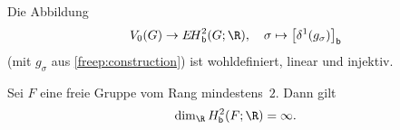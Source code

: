 \begin{thProposition}
    \label{freep:qmtocoho}%
    Die Abbildung
    \[ V_0(G) \to \EHb^2(G;\R), \quad
        \sigma \mapsto \bigl[\delta^1(g_\sigma)\bigr]_\bd
    \]
    (mit $g_\sigma$ aus \cref{freep:construction})
    ist wohldefiniert, linear und injektiv.
\end{thProposition}

\begin{thKorollar}
    \label{freep:cohofreegrp}%
    Sei $F$ eine freie Gruppe vom Rang mindestens~$2$. Dann gilt
    \[ \dim_{\R} \Hb^2(F;\R) = \infty  . \]
\end{thKorollar}
